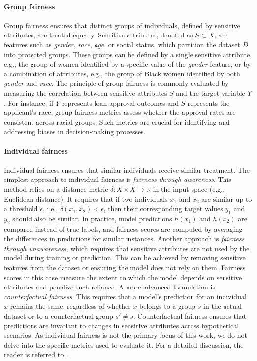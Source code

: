 \paragraph{Group fairness}\label{par:group-fairness}
%
Group fairness ensures that distinct groups of individuals, defined by sensitive attributes, are treated equally.
%
Sensitive attributes, denoted as \( S \subset X \), are features such as \emph{gender}, \emph{race}, \emph{age}, or social status, which partition the dataset \( D \) into protected groups.
%
These groups can be defined by a single sensitive attribute, e.g., the group of women identified by a specific value of the \textit{gender} feature, or by a combination of attributes, e.g., the group of Black women identified by both \textit{gender} and \textit{race}.
%
The principle of group fairness is commonly evaluated by measuring the correlation between sensitive attributes \( S \) and the target variable \( Y \).
%
For instance, if \( Y \) represents loan approval outcomes and \( S \) represents the applicant's race, group fairness metrics assess whether the approval rates are consistent across racial groups.
%
Such metrics are crucial for identifying and addressing biases in decision-making processes.


\paragraph{Individual fairness}\label{par:individual-fairness}
%
Individual fairness ensures that similar individuals receive similar treatment.
%
The simplest approach to individual fairness is \emph{fairness through awareness}.
%
This method relies on a distance metric \(\delta : X \times X \to \mathbb{R}\) in the input space (e.g., Euclidean distance).
%
It requires that if two individuals \(x_1\) and \(x_2\) are similar up to a threshold \(\epsilon\), i.e., \(\delta(x_1, x_2) < \epsilon\), then their corresponding target values \(y_1\) and \(y_2\) should also be similar.
%
In practice, model predictions \(h(x_1)\) and \(h(x_2)\) are compared instead of true labels, and fairness scores are computed by averaging the differences in predictions for similar instances.
%
Another approach is \emph{fairness through unawareness}, which requires that sensitive attributes are not used by the model during training or prediction.
%
This can be achieved by removing sensitive features from the dataset or ensuring the model does not rely on them.
%
Fairness scores in this case measure the extent to which the model depends on sensitive attributes and penalize such reliance.
%
A more advanced formulation is \emph{counterfactual fairness}.
%
This requires that a model's prediction for an individual \(x\) remains the same, regardless of whether \(x\) belongs to a group \(s\) in the actual dataset or to a counterfactual group \(s' \neq s\).
%
Counterfactual fairness ensures that predictions are invariant to changes in sensitive attributes across hypothetical scenarios.
%
As individual fairness is not the primary focus of this work, we do not delve into the specific metrics used to evaluate it.
%
For a detailed discussion, the reader is referred to~\cite{DBLP:journals/csur/MehrabiMSLG21}.


